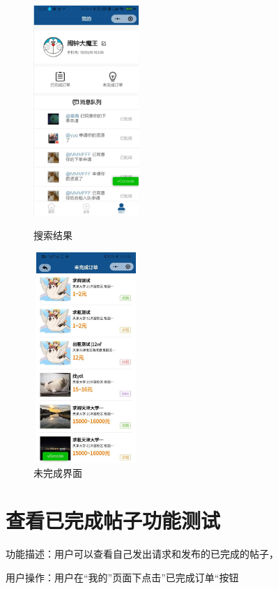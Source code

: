    \begin{figure}[htbp]
       \centering
       \begin{minipage}[t]{0.48\textwidth}
       \centering
       \includegraphics[width=4cm,height=8cm]{test/image/test47.png} 
    
      \caption{搜索结果} 
       \end{minipage}
       \begin{minipage}[t]{0.48\textwidth}
       \centering
       \includegraphics[width=4cm,height=8cm]{test/image/test48.png}
       \caption{未完成界面}
       \end{minipage}
       \end{figure}
    
   \section{查看已完成帖子功能测试}
   功能描述：用户可以查看自己发出请求和发布的已完成的帖子，
   
   用户操作：用户在“我的”页面下点击”已完成订单“按钮
   
